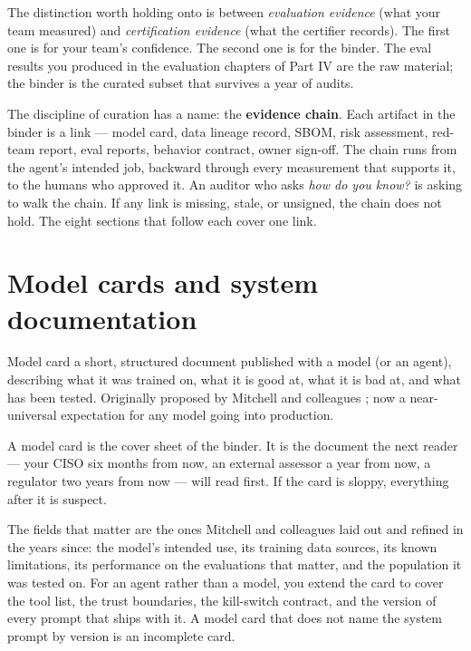 The distinction worth holding onto is between \textit{evaluation evidence} (what your team measured) and \textit{certification evidence} (what the certifier records). The first one is for your team's confidence. The second one is for the binder. The eval results you produced in the evaluation chapters of Part IV are the raw material; the binder is the curated subset that survives a year of audits.

The discipline of curation has a name: the \textbf{evidence chain}. Each artifact in the binder is a link --- model card, data lineage record, SBOM, risk assessment, red-team report, eval reports, behavior contract, owner sign-off. The chain runs from the agent's intended job, backward through every measurement that supports it, to the humans who approved it. An auditor who asks \textit{how do you know?} is asking to walk the chain. If any link is missing, stale, or unsigned, the chain does not hold. The eight sections that follow each cover one link.

\section{Model cards and system documentation}

\begin{TNdefinition}{Model card} a short, structured document published with a model (or an agent), describing what it was trained on, what it is good at, what it is bad at, and what has been tested. Originally proposed by Mitchell and colleagues \citep{mitchell2019modelcards}; now a near-universal expectation for any model going into production. \end{TNdefinition}

A model card is the cover sheet of the binder. It is the document the next reader --- your CISO six months from now, an external assessor a year from now, a regulator two years from now --- will read first. If the card is sloppy, everything after it is suspect.

The fields that matter are the ones Mitchell and colleagues laid out and refined in the years since: the model's intended use, its training data sources, its known limitations, its performance on the evaluations that matter, and the population it was tested on. For an agent rather than a model, you extend the card to cover the tool list, the trust boundaries, the kill-switch contract, and the version of every prompt that ships with it. A model card that does not name the system prompt by version is an incomplete card.

